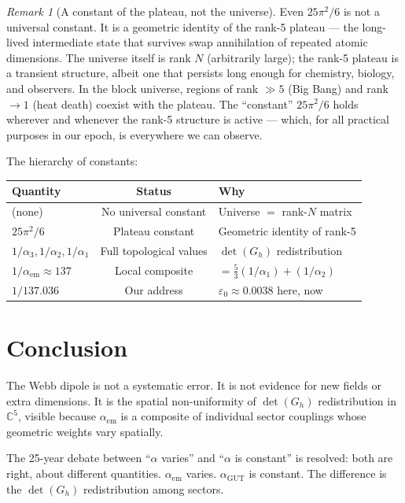 \documentclass[12pt]{article}
\theoremstyle{remark}
\newtheorem{remark}[theorem]{Remark}
\begin{document}
\begin{remark}[A constant of the plateau, not the universe]
Even $25\pi^2/6$ is not a universal constant. It is a geometric identity of the rank-5 plateau --- the long-lived intermediate state that survives swap annihilation of repeated atomic dimensions. The universe itself is rank $N$ (arbitrarily large); the rank-5 plateau is a transient structure, albeit one that persists long enough for chemistry, biology, and observers. In the block universe, regions of rank $\gg 5$ (Big Bang) and rank $\to 1$ (heat death) coexist with the plateau. The ``constant'' $25\pi^2/6$ holds wherever and whenever the rank-5 structure is active --- which, for all practical purposes in our epoch, is everywhere we can observe.

The hierarchy of constants:

\begin{center}
\begin{tabular}{lcl}
\hline
Quantity & Status & Why \\
\hline
(none) & No universal constant & Universe $=$ rank-$N$ matrix \\
$25\pi^2/6$ & Plateau constant & Geometric identity of rank-5 \\
$1/\alpha_3, 1/\alpha_2, 1/\alpha_1$ & Full topological values & $\det(G_h)$ redistribution \\
$1/\alpha_\text{em} \approx 137$ & Local composite & $= \tfrac{5}{3}(1/\alpha_1) + (1/\alpha_2)$ \\
$1/137.036$ & Our address & $\varepsilon_0 \approx 0.0038$ here, now \\
\hline
\end{tabular}
\end{center}
\end{remark}

\section{Conclusion}

The Webb dipole is not a systematic error. It is not evidence for new fields or extra dimensions. It is the spatial non-uniformity of $\det(G_h)$ redistribution in $\mathbb{C}^5$, visible because $\alpha_\text{em}$ is a composite of individual sector couplings whose geometric weights vary spatially.

The 25-year debate between ``$\alpha$ varies'' and ``$\alpha$ is constant'' is resolved: both are right, about different quantities. $\alpha_\text{em}$ varies. $\alpha_\text{GUT}$ is constant. The difference is the $\det(G_h)$ redistribution among sectors.
\end{document}
